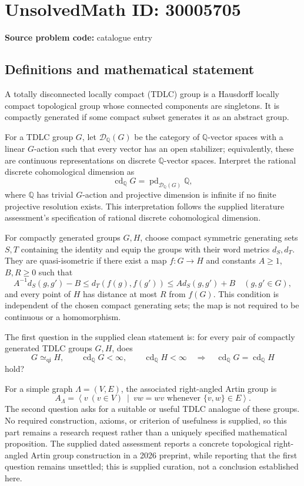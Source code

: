 \documentclass[11pt]{article}
\newcommand{\Q}{\mathbb{Q}}
\begin{document}
\section*{UnsolvedMath ID: 30005705}
\textbf{Source problem code:} catalogue entry
\subsection{Definitions and mathematical statement}
A totally disconnected locally compact (TDLC) group is a Hausdorff locally compact topological group whose connected components are singletons. It is compactly generated if some compact subset generates it as an abstract group.

For a TDLC group \(G\), let \(\mathcal D_{\Q}(G)\) be the category of \(\Q\)-vector spaces with a linear \(G\)-action such that every vector has an open stabilizer; equivalently, these are continuous representations on discrete \(\Q\)-vector spaces. Interpret the rational discrete cohomological dimension as
\[
\operatorname{cd}_{\Q}G
=\operatorname{pd}_{\mathcal D_{\Q}(G)}\Q,
\]
where \(\Q\) has trivial \(G\)-action and projective dimension is infinite if no finite projective resolution exists. This interpretation follows the supplied literature assessment's specification of rational discrete cohomological dimension.

For compactly generated groups \(G,H\), choose compact symmetric generating sets \(S,T\) containing the identity and equip the groups with their word metrics \(d_S,d_T\). They are quasi-isometric if there exist a map \(f:G\to H\) and constants \(A\geq 1\), \(B,R\geq 0\) such that
\[
A^{-1}d_S(g,g')-B
\leq d_T(f(g),f(g'))
\leq A d_S(g,g')+B
\quad(g,g'\in G),
\]
and every point of \(H\) has distance at most \(R\) from \(f(G)\). This condition is independent of the chosen compact generating sets; the map is not required to be continuous or a homomorphism.

The first question in the supplied clean statement is: for every pair of compactly generated TDLC groups \(G,H\), does
\[
G\simeq_{\mathrm{qi}}H,
\qquad \operatorname{cd}_{\Q}G<\infty,
\qquad \operatorname{cd}_{\Q}H<\infty
\quad\Longrightarrow\quad
\operatorname{cd}_{\Q}G=\operatorname{cd}_{\Q}H
\]
hold?

For a simple graph \(\Lambda=(V,E)\), the associated right-angled Artin group is
\[
A_{\Lambda}
=\left\langle v\ (v\in V)\ \middle|\
vw=wv\text{ whenever }\{v,w\}\in E\right\rangle.
\]
The second question asks for a suitable or useful TDLC analogue of these groups. No required construction, axioms, or criterion of usefulness is supplied, so this part remains a research request rather than a uniquely specified mathematical proposition. The supplied dated assessment reports a concrete topological right-angled Artin group construction in a 2026 preprint, while reporting that the first question remains unsettled; this is supplied curation, not a conclusion established here.
\end{document}
